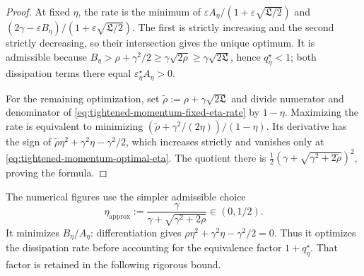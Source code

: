 \begin{proof}
At fixed $\eta$, the rate is the minimum of
$\varepsilon A_\eta/(1+\varepsilon\sqrt{\mathfrak L/2})$ and
$(2\gamma-\varepsilon B_\eta)/(1+\varepsilon\sqrt{\mathfrak L/2})$.
The first is strictly increasing and the second strictly decreasing,
so their intersection gives the unique optimum.
It is admissible because
$B_\eta>\rho+\gamma^2/2\ge\gamma\sqrt{2\rho}
\ge\gamma\sqrt{2\mathfrak L}$, hence $q_\eta^\star<1$;
both dissipation terms there equal $\varepsilon_\eta^\star A_\eta>0$.

For the remaining optimization, set
$\widetilde\rho:=\rho+\gamma\sqrt{2\mathfrak L}$ and divide numerator
and denominator of \eqref{eq:tightened-momentum-fixed-eta-rate} by $1-\eta$.
Maximizing the rate is equivalent to minimizing
$(\widetilde\rho+\gamma^2/(2\eta))/(1-\eta)$.
Its derivative has the sign of
$\widetilde\rho\eta^2+\gamma^2\eta-\gamma^2/2$, which increases strictly
and vanishes only at \eqref{eq:tightened-momentum-optimal-eta}.
The quotient there is
$\frac12(\gamma+\sqrt{\gamma^2+2\widetilde\rho})^2$, proving the formula.
\end{proof}

The numerical figures use the simpler admissible choice
\begin{equation}\label{eq:tightened-momentum-eta-approx}
 \eta_{\mathrm{approx}}
 :=\frac{\gamma}{\gamma+\sqrt{\gamma^2+2\rho}}\in(0,1/2).
\end{equation}
It minimizes $B_\eta/A_\eta$: differentiation gives
$\rho\eta^2+\gamma^2\eta-\gamma^2/2=0$.
Thus it optimizes the dissipation rate before accounting for the
equivalence factor $1+q_\eta^\star$. That factor is retained in the
following rigorous bound.

